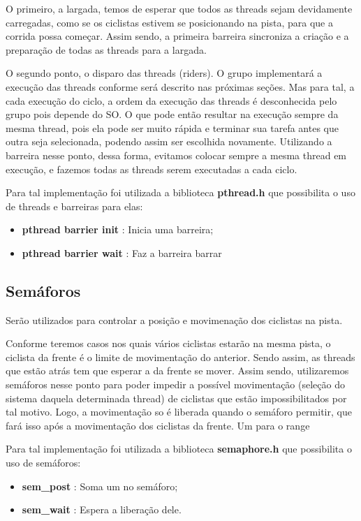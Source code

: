 \documentclass[12pt,a4paper]{article}
\begin{document}
    O primeiro, a largada, temos de esperar que todos as threads sejam devidamente carregadas, como se os ciclistas estivem se posicionando na pista, para que a corrida possa começar. Assim sendo, a primeira barreira sincroniza a criação e a preparação de todas as threads para a largada.
    
    O segundo ponto, o disparo das threads (riders). O grupo implementará a execução das threads conforme será descrito nas próximas seções. Mas para tal, a cada execução do ciclo, a ordem da execução das threads é desconhecida pelo grupo pois depende do SO. O que pode então resultar na execução sempre da mesma thread, pois ela pode ser muito rápida e terminar sua tarefa antes que outra seja selecionada, podendo assim ser escolhida novamente. Utilizando a barreira nesse ponto, dessa forma, evitamos colocar sempre a mesma thread em execução, e fazemos todas as threads serem executadas a cada ciclo.

    Para tal implementação foi utilizada a biblioteca \textbf{pthread.h} que possibilita o uso de threads e barreiras para elas:
    \begin{itemize}
    \item  \textbf{pthread barrier init} : Inicia uma barreira;
    \item  \textbf{pthread barrier wait} : Faz a barreira barrar 
    \end{itemize}


\subsection{Semáforos}

    Serão utilizados para controlar a posição e movimenação dos ciclistas na pista.
    
    Conforme teremos casos nos quais vários ciclistas estarão na mesma pista, o ciclista da frente é o limite de movimentação do anterior. Sendo assim, as threads que estão atrás tem que esperar a da frente se mover. Assim sendo, utilizaremos semáforos nesse ponto para poder impedir a possível movimentação (seleção do sistema daquela determinada thread) de ciclistas que estão impossibilitados por tal motivo. Logo, a movimentação so é liberada quando o semáforo permitir, que fará isso após a movimentação dos ciclistas da frente. 
    Um para o range
    
        Para tal implementação foi utilizada a biblioteca \textbf{semaphore.h} que possibilita o uso de semáforos:
    \begin{itemize}
    \item  \textbf{sem\_post} : Soma um no semáforo;
    \item  \textbf{sem\_wait} : Espera a liberação dele.
    \end{itemize}
\end{document}
